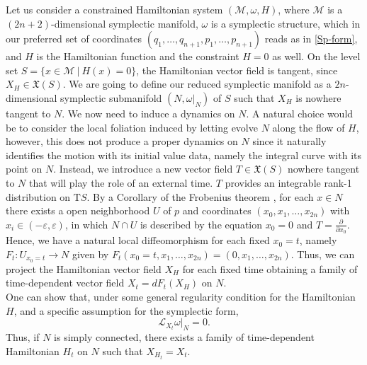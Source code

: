 \documentclass{article}
\numberwithin{equation}{section}
\theoremstyle{definition}
\newcommand{\M}{\mathcal{M}}
\newcommand{\T}{\mathrm{T}}
\newcommand{\pder}[2]{\frac{\partial #1}{\partial #2}}
\begin{document}
Let us consider a constrained Hamiltonian system $(\M,\omega,H)$, where $\M$ is a $(2n+2)$-dimensional symplectic manifold, $\omega$ is a symplectic structure, which in our preferred set of coordinates $(q_1,\dots,q_{n+1},p_1,\dots,p_{n+1})$ reads as in \eqref{Sp-form}, and $H$ is the Hamiltonian function and the constraint $H=0$ as well. On the level set $S=\{x\in\M\ |\ H(x)=0\}$, the Hamiltonian vector field is tangent, since $X_H\in\mathfrak{X}(S)$. We are going to define our reduced symplectic manifold as a $2n$-dimensional symplectic submanifold $(N,\omega|_N)$ of $S$ such that $X_H$ is nowhere tangent to $N$. We now need to induce a dynamics on $N$. A natural choice would be to consider the local foliation induced by letting evolve $N$ along the flow of $H$, however, this does not produce a proper dynamics on $N$ since it naturally identifies the motion with its initial value data, namely the integral curve with its point on $N$. Instead, we introduce a new vector field $T\in\mathfrak{X}(S)$ nowhere tangent to $N$ that will play the role of an external time. $T$ provides an integrable rank-1 distribution on $\T S$. By a Corollary of the Frobenius theorem \cite{Lee_2014}, for each $x\in N$ there exists a open neighborhood $U$ of $p$ and coordinates $(x_0,x_1,\dots,x_{2n})$ with $x_i\in(-\varepsilon,\varepsilon)$, in which $N\cap U$ is described by the equation $x_0=0$ and $T=\pder{}{x_0}$. Hence, we have a natural local diffeomorphism for each fixed $x_0=t$, namely $F_{t}:U_{x_0=t}\to N$ given by $F_{t}(x_0=t,x_1,\dots,x_{2n})=(0,x_1,\dots,x_{2n})$. Thus, we can project the Hamiltonian vector field $X_H$ for each fixed time obtaining a family of time-dependent vector field $X_t=dF_t(X_H)$ on $N$.\\
One can show that, under some general regularity condition for the Hamiltonian $H$, and a specific assumption for the symplectic form,
\begin{equation}
    \mathcal{L}_{X_t}\omega|_N=0.
\end{equation}
Thus, if $N$ is simply connected, there exists a family of time-dependent Hamiltonian $H_t$ on $N$ such that $X_{H_t}=X_t$.
\end{document}
